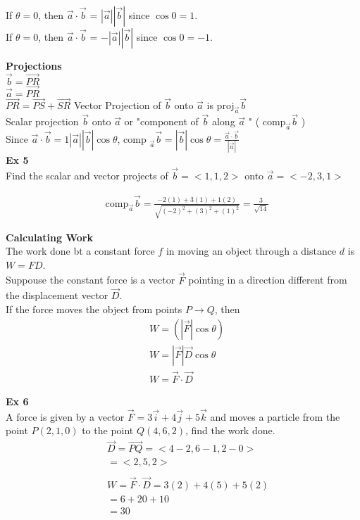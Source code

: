 \documentclass{article}
\begin{document}
  If $ \theta = 0 $, then $ \vec{ a } \cdot \vec{ b }   $ = $ | \vec{ a }  |  | \vec{ b }  |$ since $ \cos{0} = 1$.\\
  If $ \theta = 0 $, then $ \vec{ a } \cdot \vec{ b }   $ = $ -| \vec{ a }  |  | \vec{ b }  |$ since $ \cos{0} = -1$.

  \textbf{Projections}\\
  $ \vec{ b } = \vec{ PR }   $\\
  $ \vec{ a } = \vec{ PR }   $ \\
  $ \vec{ PR } = \vec{ PS } + \vec{ SR }   $
  Vector Projection of $ \vec{ b }  $ onto $\vec{ a }$ is proj$ _{ \vec{ a } } \vec{ b }    $\\
  Scalar projection $ \vec{ b }  $ onto $ \vec{ a }  $ or "component of $ \vec{ b }  $ along $ \vec{ a }  $  " ( comp$ _{ \vec{ a } } \vec{ b }   $ )  \\
Since $ \vec{ a }  \cdot \vec{ b }  = 1 | \vec{ a }  | | \vec{ b }  | \cos{\theta} $, comp $ _{ \vec{ a }}  \vec{ b } = | \vec{ b } | \cos{\theta} = \frac{ \vec{ a } \cdot \vec{ b }   }{ | \vec{ a }  | }  $\\
\textbf{Ex 5}\\
Find the scalar and vector projects of $  \vec{ b } = < 1, 1, 2>   $ onto $ \vec{ a } = < -2, 3, 1>   $   

\[
  \begin{aligned}
  &	\text{comp} _{ \vec{ a } }\vec{ b } = \frac{ -2(1) + 3(1) + 1(2)}{ \sqrt{ (-2) ^{2} + (3)^2 + (1)^2  }} = \boxed{ \frac{ 3 }{ \sqrt{ 14 }   } }
  \end{aligned}
\]

\textbf{Calculating Work}\\
The work done bt a constant force $ f $  in moving an object through a distance $ d $  is $ W=FD $.\\
Suppouse the constant force is a vector $ \vec{ F }  $ pointing in a direction different from the displacement vector $\vec{ D }$.\\
If the force moves the object from points $ P \to Q $, then
\[
  \begin{aligned}
  & W= ( | \vec{ F }  | \cos{\theta})\\ 
  & W = | \vec{ F }  | \vec{ D } \cos{ \theta}\\
  & W = \vec{ F } \cdot \vec{ D }  
  \end{aligned}
\]

\textbf{Ex 6}\\
A force is given by a vector $ \vec{ F } = 3 \vec{ i } + 4 \vec{ j } + 5 \vec{ k } $ and moves a particle from the point $ P (2,1,0) $ to the point $ Q(4,6,2) $, find the work done.
\[
  \begin{aligned}
  &	\vec{ D } = \vec{ PQ } = < 4-2, 6-1, 2-0>\\
  & = < 2, 5, 2>\\
  ~\\
  & W = \vec{ F } \cdot \vec{ D } = 3(2) + 4(5) + 5(2) \\
  & = 6 + 20 + 10\\
  & = \boxed{30}
  \end{aligned}
\]

 
\end{document}
